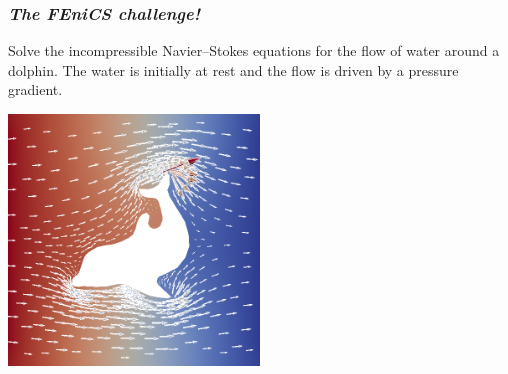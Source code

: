 \begin{frame}
  \frametitle{\emph{The FEniCS challenge!}}

  \linespread{1.5}

  Solve the incompressible Navier--Stokes equations for the flow of
  water around a dolphin. The water is initially at rest and the flow
  is driven by a pressure gradient.

  \begin{center}
    \includegraphics[width=0.5\textwidth]{png/dolfin_channel.png}
  \end{center}

\end{frame}
